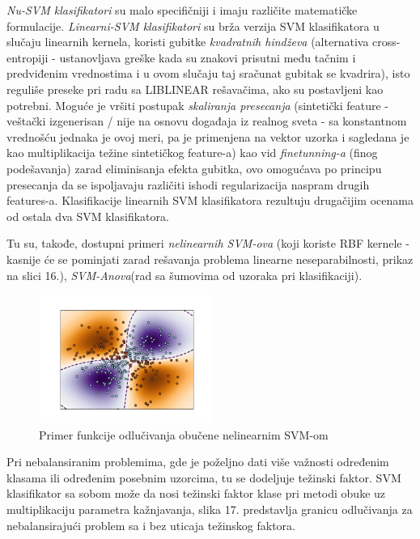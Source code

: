 \documentclass[fontsize=12bp, paper=a4]{scrarticle}
\begin{document}
\textit{Nu-SVM klasifikatori} su malo specifičniji i imaju različite matematičke formulacije. \textit{Linearni-SVM klasifikatori} su brža verzija SVM klasifikatora u slučaju linearnih kernela, koristi gubitke \textit{kvadratnih hindževa} (alternativa cross-entropiji - ustanovljava greške kada su znakovi prisutni među tačnim i predviđenim vrednostima i u ovom slučaju taj sračunat gubitak se kvadrira)\cite{hinge}, isto reguliše preseke pri radu sa LIBLINEAR rešavačima\cite{liblinear}, ako su postavljeni kao potrebni. Moguće je vršiti postupak \textit{skaliranja presecanja} (sintetički feature - veštački izgenerisan / nije na osnovu događaja iz realnog sveta - sa konstantnom vrednošću jednaka je ovoj meri, pa je primenjena na vektor uzorka i sagledana je kao multiplikacija težine sintetičkog feature-a)\cite{intercept-scaling}\cite{syntetic-feature} kao vid \textit{finetunning-a} (finog podešavanja) zarad eliminisanja efekta gubitka, ovo omogućava po principu presecanja da se ispoljavaju različiti ishodi regularizacija naspram drugih features-a. Klasifikacije linearnih SVM klasifikatora rezultuju drugačijim ocenama od ostala dva SVM klasifikatora.

Tu su, takođe, dostupni primeri \textit{nelinearnih SVM-ova} (koji koriste RBF kernele - kasnije će se pominjati zarad rešavanja problema linearne neseparabilnosti, prikaz na slici 16.)\cite{nonlinsvm}, \textit{SVM-Anova}(rad sa šumovima od uzoraka pri klasifikaciji)\cite{anova}.

\begin{figure}[h!]
    \centering
    \includegraphics[width=0.5\textwidth]{image-14.png}
    \caption{Primer funkcije odlučivanja obučene nelinearnim SVM-om}
\end{figure}





Pri nebalansiranim problemima, gde je poželjno dati više važnosti određenim klasama ili određenim posebnim uzorcima, tu se dodeljuje težinski faktor.
SVM klasifikator sa sobom može da nosi težinski faktor klase pri metodi obuke uz multiplikaciju parametra kažnjavanja, slika 17. predstavlja granicu odlučivanja za nebalansirajući problem sa i bez uticaja težinskog faktora.  
\end{document}
